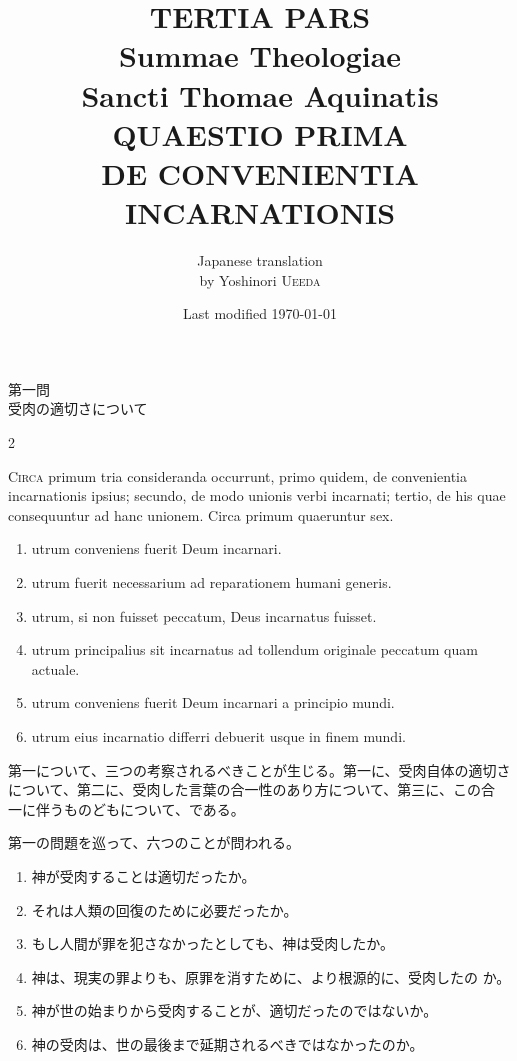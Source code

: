 \documentclass[paper=a4paper,fontsize=10pt,jafontsize=9pt,titlepage]{jlreq}
\title{{\bfseries TERTIA PARS}\\{\Huge Summae Theologiae}\\Sancti Thomae
Aquinatis\\{\sffamily QUAESTIO PRIMA}\\DE CONVENIENTIA INCARNATIONIS}
\author{Japanese translation\\by Yoshinori {\scshape Ueeda}}
\date{Last modified \today}
\begin{document}
\maketitle
\pagestyle{fancy}

\begin{center}
{\Large 第一問\\受肉の適切さについて}
\end{center}



\begin{paracol}{2}

{\Huge C}{\scshape irca} primum tria consideranda occurrunt, primo quidem, de convenientia
incarnationis ipsius; secundo, de modo unionis verbi incarnati; tertio,
de his quae consequuntur ad hanc unionem. Circa primum quaeruntur
sex. 

\begin{enumerate}
 \item utrum conveniens fuerit Deum incarnari.
 \item utrum fuerit necessarium ad reparationem humani generis.
 \item utrum, si non fuisset peccatum, Deus incarnatus fuisset.
 \item utrum principalius sit incarnatus ad tollendum originale peccatum
       quam actuale.
 \item utrum conveniens fuerit Deum incarnari a principio mundi.
 \item utrum
eius incarnatio differri debuerit usque in finem mundi.
\end{enumerate}

\switchcolumn

第一について、三つの考察されるべきことが生じる。第一に、受肉自体の適切さ
 について、第二に、受肉した言葉の合一性のあり方について、第三に、この合
 一に伴うものどもについて、である。

第一の問題を巡って、六つのことが問われる。
\begin{enumerate}
 \item 神が受肉することは適切だったか。
 \item それは人類の回復のために必要だったか。
 \item もし人間が罪を犯さなかったとしても、神は受肉したか。
 \item 神は、現実の罪よりも、原罪を消すために、より根源的に、受肉したの
       か。
 \item 神が世の始まりから受肉することが、適切だったのではないか。
 \item 神の受肉は、世の最後まで延期されるべきではなかったのか。
\end{enumerate}

\end{paracol}
\end{document}
